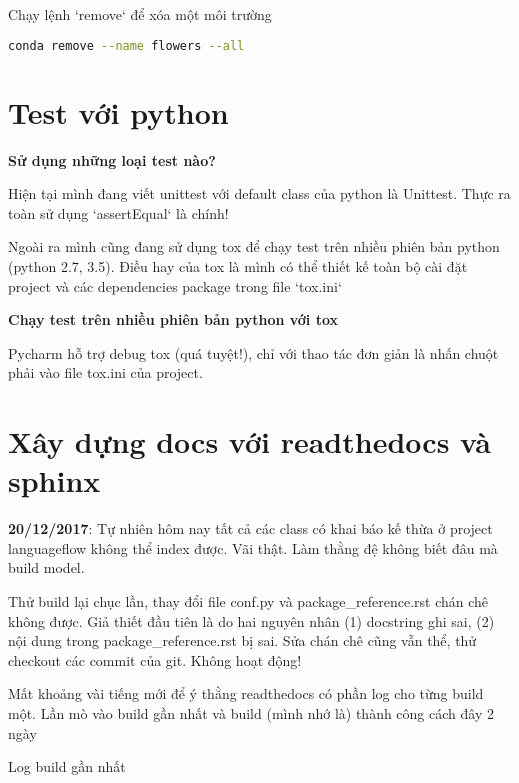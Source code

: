 Chạy lệnh `remove` để xóa một môi trường

\begin{lstlisting}[language=bash]
conda remove --name flowers --all
\end{lstlisting}

\section{Test với python}

\textbf{Sử dụng những loại test nào?}

Hiện tại mình đang viết unittest với default class của python là Unittest. Thực ra toàn sử dụng `assertEqual` là chính!

Ngoài ra mình cũng đang sử dụng tox để chạy test trên nhiều phiên bản python (python 2.7, 3.5). Điều hay của tox là mình có thể thiết kế toàn bộ cài đặt project và các dependencies package trong file `tox.ini`

\textbf{Chạy test trên nhiều phiên bản python với tox}

Pycharm hỗ trợ debug tox (quá tuyệt!), chỉ với thao tác đơn giản là nhấn chuột phải vào file tox.ini của project.

\section{Xây dựng docs với readthedocs và sphinx}

\noindent \textbf{20/12/2017}: Tự nhiên hôm nay tất cả các class có khai báo kế thừa ở project languageflow không thể index được. Vãi thật. Làm thằng đệ không biết đâu mà build model.

Thử build lại chục lần, thay đổi file conf.py và package\_reference.rst chán chê không được. Giả thiết đầu tiên là do hai nguyên nhân (1) docstring ghi sai, (2) nội dung trong package\_reference.rst bị sai. Sửa chán chê cũng vẫn thể, thử checkout các commit của git. Không hoạt động!

Mất khoảng vài tiếng mới để ý thằng readthedocs có phần log cho từng build một. Lần mò vào build gần nhất và build (mình nhớ là) thành công cách đây 2 ngày

\noindent Log build gần nhất

